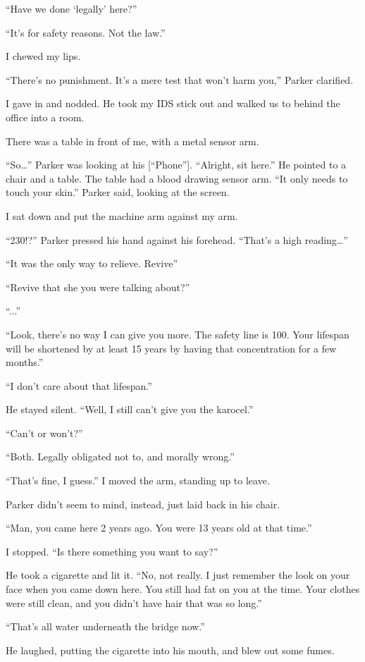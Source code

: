 “Have we done ‘legally’ here?”

“It's for safety reasons. Not the law.”

I chewed my lips.

“There’s no punishment. It’s a mere test that won’t harm you,” Parker clarified.

I gave in and nodded. He took my IDS stick out and walked us to behind the office into a room.

There was a table in front of me, with a metal sensor arm.

“So…” Parker was looking at his [“Phone”]. “Alright, sit here.” He pointed to a chair and a table. The table had a blood drawing sensor arm. “It only needs to touch your skin.” Parker said, looking at the screen.

I sat down and put the machine arm against my arm.

“230!?” Parker pressed his hand against his forehead. “That’s a high reading…”

“It was the only way to relieve. Revive”

“Revive that she you were talking about?”

“...”

“Look, there’s no way I can give you more. The safety line is 100. Your lifespan will be shortened by at least 15 years by having that concentration for a few months.”

“I don’t care about that lifespan.”

He stayed silent. “Well, I still can’t give you the karocel.”

“Can’t or won’t?”

“Both. Legally obligated not to, and morally wrong.”

“That’s fine, I guess.” I moved the arm, standing up to leave.

Parker didn’t seem to mind, instead, just laid back in his chair.

“Man, you came here 2 years ago. You were 13 years old at that time.”

I stopped. “Is there something you want to say?”

He took a cigarette and lit it. “No, not really. I just remember the look on your face when you came down here. You still had fat on you at the time. Your clothes were still clean, and you didn’t have hair that was so long.”

“That’s all water underneath the bridge now.”

He laughed, putting the cigarette into his mouth, and blew out some fumes. 

